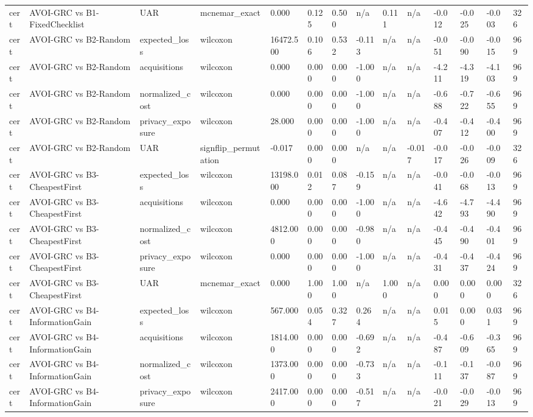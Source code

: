 \begin{table}[!ht]
{\begin{tabular}{llllllllllllll}
cert & AVOI-GRC vs B1-FixedChecklist & UAR & mcnemar\_exact & 0.000 & 0.125 & 0.500 & n/a & 0.111 & n/a & -0.012 & -0.025 & -0.003 & 326 \\
cert & AVOI-GRC vs B2-Random & expected\_loss & wilcoxon & 16472.500 & 0.106 & 0.532 & -0.113 & n/a & n/a & -0.051 & -0.090 & -0.015 & 969 \\
cert & AVOI-GRC vs B2-Random & acquisitions & wilcoxon & 0.000 & 0.000 & 0.000 & -1.000 & n/a & n/a & -4.211 & -4.319 & -4.103 & 969 \\
cert & AVOI-GRC vs B2-Random & normalized\_cost & wilcoxon & 0.000 & 0.000 & 0.000 & -1.000 & n/a & n/a & -0.688 & -0.722 & -0.655 & 969 \\
cert & AVOI-GRC vs B2-Random & privacy\_exposure & wilcoxon & 28.000 & 0.000 & 0.000 & -1.000 & n/a & n/a & -0.407 & -0.412 & -0.400 & 969 \\
cert & AVOI-GRC vs B2-Random & UAR & signflip\_permutation & -0.017 & 0.000 & 0.000 & n/a & n/a & -0.017 & -0.017 & -0.026 & -0.009 & 326 \\
cert & AVOI-GRC vs B3-CheapestFirst & expected\_loss & wilcoxon & 13198.000 & 0.012 & 0.087 & -0.159 & n/a & n/a & -0.041 & -0.068 & -0.013 & 969 \\
cert & AVOI-GRC vs B3-CheapestFirst & acquisitions & wilcoxon & 0.000 & 0.000 & 0.000 & -1.000 & n/a & n/a & -4.642 & -4.793 & -4.490 & 969 \\
cert & AVOI-GRC vs B3-CheapestFirst & normalized\_cost & wilcoxon & 4812.000 & 0.000 & 0.000 & -0.980 & n/a & n/a & -0.445 & -0.490 & -0.401 & 969 \\
cert & AVOI-GRC vs B3-CheapestFirst & privacy\_exposure & wilcoxon & 0.000 & 0.000 & 0.000 & -1.000 & n/a & n/a & -0.431 & -0.437 & -0.424 & 969 \\
cert & AVOI-GRC vs B3-CheapestFirst & UAR & mcnemar\_exact & 0.000 & 1.000 & 1.000 & n/a & 1.000 & n/a & 0.000 & 0.000 & 0.000 & 326 \\
cert & AVOI-GRC vs B4-InformationGain & expected\_loss & wilcoxon & 567.000 & 0.054 & 0.327 & 0.264 & n/a & n/a & 0.015 & 0.000 & 0.031 & 969 \\
cert & AVOI-GRC vs B4-InformationGain & acquisitions & wilcoxon & 1814.000 & 0.000 & 0.000 & -0.692 & n/a & n/a & -0.487 & -0.609 & -0.365 & 969 \\
cert & AVOI-GRC vs B4-InformationGain & normalized\_cost & wilcoxon & 1373.000 & 0.000 & 0.000 & -0.733 & n/a & n/a & -0.111 & -0.137 & -0.087 & 969 \\
cert & AVOI-GRC vs B4-InformationGain & privacy\_exposure & wilcoxon & 2417.000 & 0.000 & 0.000 & -0.517 & n/a & n/a & -0.021 & -0.029 & -0.013 & 969 \\

\end{tabular}}
\end{table}

